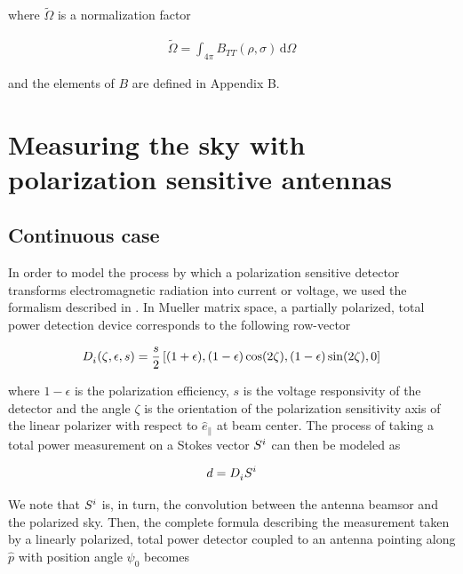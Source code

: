 \documentclass[a4paper,11pt]{article}
\newcommand{\co}{\mathbin{\|}}
\begin{document}
\noindent
where $\tilde{\Omega}$ is a normalization factor

\begin{equation}
\begin{aligned}
\tilde{\Omega} = \int_{4\pi} B_{TT}(\rho,\sigma) \, \mathrm{d} \Omega
\end{aligned}
\end{equation}

\noindent
and the elements of $B$ are defined in Appendix B. 

\section{Measuring the sky with polarization sensitive antennas}

\subsection{Continuous case}

In order to model the process by which a polarization sensitive detector transforms electromagnetic radiation into current or voltage, we used the formalism described in \cite{2007MNRAS.376.1767O}. In Mueller matrix space, a partially polarized, total power detection device corresponds to the following row-vector 

\begin{equation}
\begin{aligned}
\tensor{D}{_{i}}(\zeta,\epsilon,s) = \frac{s}{2} \left[(1 + \epsilon), (1 - \epsilon)\cos(2\zeta), (1 - \epsilon)\sin(2\zeta), 0 \right]
\end{aligned}
\label{eq::M_pol}
\end{equation}

\noindent
where $1 - \epsilon$ is the polarization efficiency, $s$ is the voltage responsivity of the detector and the angle $\zeta$ is the orientation of the polarization sensitivity axis of the linear polarizer with respect to $\hat{e}_{\co}$ at beam center. The process of taking a total power measurement on a Stokes vector $\tensor{S}{^{i}}$ can then be modeled as

\begin{equation}
\begin{aligned}
d = \tensor{D}{_{i}} \tensor{S}{^{i}}
\end{aligned}
\label{eq::total_power_measurement}
\end{equation}

We note that $\tensor{S}{^{i}}$ is, in turn, the convolution between the antenna beamsor and the polarized sky. Then, the complete formula describing the measurement taken by a linearly polarized, total power detector coupled to an antenna pointing along $\hat{p}$ with position angle $\psi_0$ becomes
\end{document}
